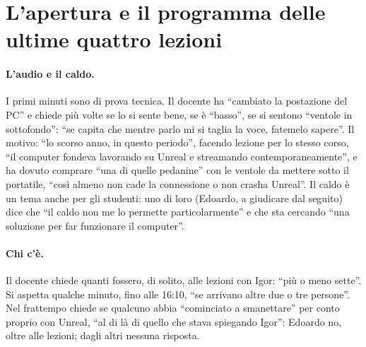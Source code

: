 \section{L'apertura e il programma delle ultime quattro lezioni}
\label{ue13:sec:apertura}

\paragraph{L'audio e il caldo.} I primi minuti sono di prova tecnica. Il docente ha
``cambiato la postazione del PC'' e chiede più volte se lo si sente bene, se è ``basso'', se
si sentono ``ventole in sottofondo'': ``se capita che mentre parlo mi si taglia la voce,
fatemelo sapere''. Il motivo: ``lo scorso anno, in questo periodo'', facendo lezione per lo
stesso corso, ``il computer fondeva lavorando su Unreal e streamando contemporaneamente'', e
ha dovuto comprare ``una di quelle pedanine'' con le ventole da mettere sotto il portatile,
``così almeno non cade la connessione o non crasha Unreal''. Il caldo è un tema anche per
gli studenti: uno di loro (Edoardo, a giudicare dal seguito) dice che ``il caldo non me lo
permette particolarmente'' e che sta cercando ``una soluzione per far funzionare il
computer''.

\paragraph{Chi c'è.} Il docente chiede quanti fossero, di solito, alle lezioni con Igor:
``più o meno sette''. Si aspetta qualche minuto, fino alle 16:10, ``se arrivano altre due o
tre persone''. Nel frattempo chiede se qualcuno abbia ``cominciato a smanettare'' per conto
proprio con Unreal, ``al di là di quello che stava spiegando Igor'': Edoardo no, oltre alle
lezioni; dagli altri nessuna risposta.

